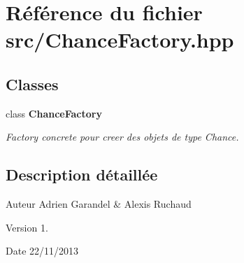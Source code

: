 \section{Référence du fichier src/\-Chance\-Factory.hpp}
\label{_chance_factory_8hpp}
\subsection*{Classes}
\begin{DoxyCompactItemize}
\item 
class {\bf Chance\-Factory}
\begin{DoxyCompactList}\small\item\em Factory concrete pour creer des objets de type Chance. \end{DoxyCompactList}\end{DoxyCompactItemize}


\subsection{Description détaillée}
\begin{DoxyAuthor}{Auteur}
Adrien Garandel \& Alexis Ruchaud 
\end{DoxyAuthor}
\begin{DoxyVersion}{Version}
1. 
\end{DoxyVersion}
\begin{DoxyDate}{Date}
22/11/2013 
\end{DoxyDate}
